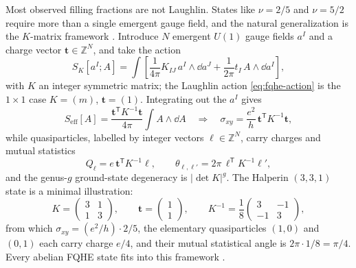 Most observed filling fractions are not Laughlin. States like $\nu=2/5$ and $\nu=5/2$ require more than a single emergent gauge field, and the natural generalization is the $K$-matrix framework \cite{WenZee1992AbelianQHClassification}. Introduce $N$ emergent $U(1)$ gauge fields $a^I$ and a charge vector $\mathbf{t}\in\mathbb{Z}^N$, and take the action
\begin{equation}
  S_{K}[a^I;A]
  =
  \int\left[
  \frac{1}{4\pi}K_{IJ}\,a^I\wedge\dd a^J
  +
  \frac{1}{2\pi}t_I\,A\wedge\dd a^I
  \right],
  \label{eq:fqhe-k-matrix-action}
\end{equation}
with $K$ an integer symmetric matrix; the Laughlin action \eqref{eq:fqhe-action} is the $1\times 1$ case $K=(m)$, $\mathbf{t}=(1)$. Integrating out the $a^I$ gives
\begin{equation}
  S_{\mathrm{eff}}[A]
  =
  \frac{\mathbf{t}^{\mathsf{T}}K^{-1}\mathbf{t}}{4\pi}\int A\wedge\dd A
  \quad\Longrightarrow\quad
  \sigma_{xy} = \frac{e^2}{h}\,\mathbf{t}^{\mathsf{T}}K^{-1}\mathbf{t},
  \label{eq:fqhe-k-hall}
\end{equation}
while quasiparticles, labelled by integer vectors $\boldsymbol{\ell}\in\mathbb{Z}^N$, carry charges and mutual statistics
\begin{equation}
  Q_{\boldsymbol{\ell}} = e\,\mathbf{t}^{\mathsf{T}}K^{-1}\boldsymbol{\ell},
  \qquad
  \theta_{\boldsymbol{\ell},\boldsymbol{\ell}'} = 2\pi\,\boldsymbol{\ell}^{\mathsf{T}}K^{-1}\boldsymbol{\ell}',
\end{equation}
and the genus-$g$ ground-state degeneracy is $|\det K|^{g}$. The Halperin $(3,3,1)$ state is a minimal illustration:
\begin{equation}
  K = \begin{pmatrix} 3 & 1 \\ 1 & 3\end{pmatrix},
  \qquad
  \mathbf{t} = \begin{pmatrix}1\\1\end{pmatrix},
  \qquad
  K^{-1} = \frac{1}{8}\begin{pmatrix} 3 & -1 \\ -1 & 3\end{pmatrix},
\end{equation}
from which $\sigma_{xy} = (e^{2}/h)\cdot 2/5$, the elementary quasiparticles $(1,0)$ and $(0,1)$ each carry charge $e/4$, and their mutual statistical angle is $2\pi\cdot 1/8 = \pi/4$. Every abelian FQHE state fits into this framework \cite{WenZee1992AbelianQHClassification,Wen1995TopologicalOrdersEdgeExcitations,HalperinJain2020FQHENewDevelopments}.

